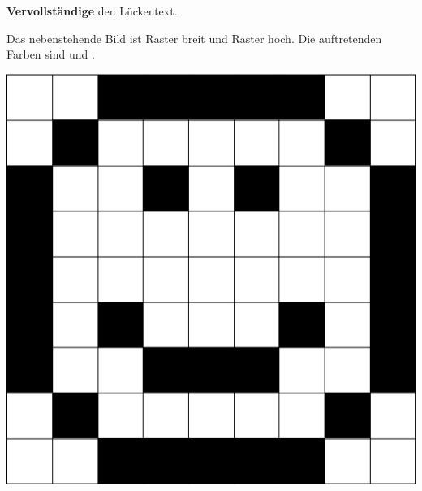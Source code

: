 \documentclass[a4paper, 12pt]{article}
\begin{document}
\TITEL

\aufgabe{}
	\begin{minipage}{0.65\textwidth}\vspace{0pt}
	\textbf{Vervollständige} den Lückentext.
	\begin{LKtext}
		Das nebenstehende Bild ist  Raster breit und  Raster hoch. Die auftretenden Farben sind \newline und .	
	\end{LKtext}
	\end{minipage}
	\hfill
	\begin{minipage}{0.25\textwidth}\vspace{0pt}
		\includegraphics[width=\linewidth]{A_1.png}
	\end{minipage}
\end{document}
